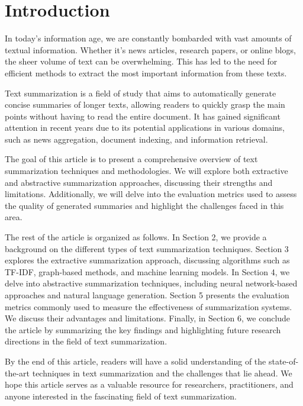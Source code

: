 \section{Introduction}

In today's information age, we are constantly bombarded with vast amounts of textual information. Whether it's news articles, research papers, or online blogs, the sheer volume of text can be overwhelming. This has led to the need for efficient methods to extract the most important information from these texts.

Text summarization is a field of study that aims to automatically generate concise summaries of longer texts, allowing readers to quickly grasp the main points without having to read the entire document. It has gained significant attention in recent years due to its potential applications in various domains, such as news aggregation, document indexing, and information retrieval.

The goal of this article is to present a comprehensive overview of text summarization techniques and methodologies. We will explore both extractive and abstractive summarization approaches, discussing their strengths and limitations. Additionally, we will delve into the evaluation metrics used to assess the quality of generated summaries and highlight the challenges faced in this area.

The rest of the article is organized as follows. In Section 2, we provide a background on the different types of text summarization techniques. Section 3 explores the extractive summarization approach, discussing algorithms such as TF-IDF, graph-based methods, and machine learning models. In Section 4, we delve into abstractive summarization techniques, including neural network-based approaches and natural language generation. Section 5 presents the evaluation metrics commonly used to measure the effectiveness of summarization systems. We discuss their advantages and limitations. Finally, in Section 6, we conclude the article by summarizing the key findings and highlighting future research directions in the field of text summarization.

By the end of this article, readers will have a solid understanding of the state-of-the-art techniques in text summarization and the challenges that lie ahead. We hope this article serves as a valuable resource for researchers, practitioners, and anyone interested in the fascinating field of text summarization.
